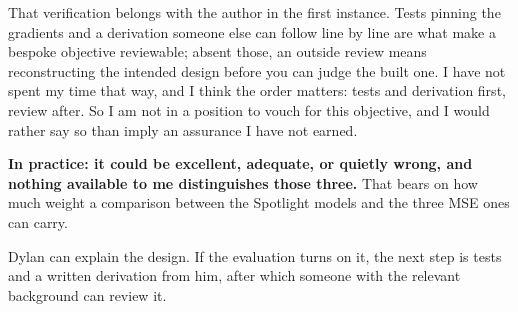 That verification belongs with the author in the first instance. Tests pinning the gradients and a
derivation someone else can follow line by line are what make a bespoke objective reviewable;
absent those, an outside review means reconstructing the intended design before you can judge the
built one. I have not spent my time that way, and I think the order matters: tests and derivation
first, review after. So I am not in a position to vouch for this objective, and I would rather say
so than imply an assurance I have not earned.

\textbf{In practice: it could be excellent, adequate, or quietly wrong, and nothing available to me
distinguishes those three.} That bears on how much weight a comparison between the Spotlight models
and the three MSE ones can carry.

Dylan can explain the design. If the evaluation turns on it, the next step is tests and a written
derivation from him, after which someone with the relevant background can review it.

